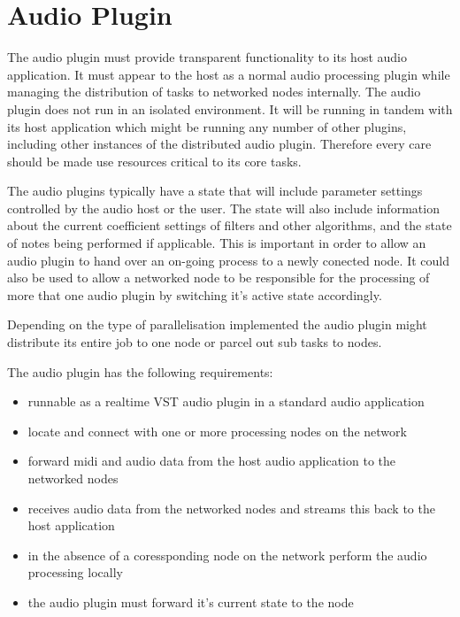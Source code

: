 \section{Audio Plugin}

The audio plugin must provide transparent functionality to its host audio application. It must appear to the host as a normal audio processing plugin while managing the distribution of tasks to networked nodes internally. The audio plugin does not run in an isolated environment. It will be running in tandem with its host application which might be running any number of other plugins, including other instances of the distributed audio plugin. Therefore every care should be made use resources critical to its core tasks.

The audio plugins typically have a state that will include parameter settings controlled by the audio host or the user. The state will also include information about the current coefficient settings of filters and other algorithms, and the state of notes being performed if applicable. This is important in order to allow an audio plugin to hand over an on-going process to a newly conected node. It could also be used to allow a networked node to be responsible for the processing of more that one audio plugin by switching it's active state accordingly.

Depending on the type of parallelisation implemented the audio plugin might distribute its entire job to one node or parcel out sub tasks to nodes.

The audio plugin has the following requirements:

\begin{itemize}

\item runnable as a realtime VST audio plugin in a standard audio application
\item locate and connect with one or more processing nodes on the network
\item forward midi and audio data from the host audio application to the networked nodes
\item receives audio data from the networked nodes and streams this back to the host application
\item in the absence of a coressponding node on the network perform the audio processing locally
\item the audio plugin must forward it's current state to the node

\end{itemize}
